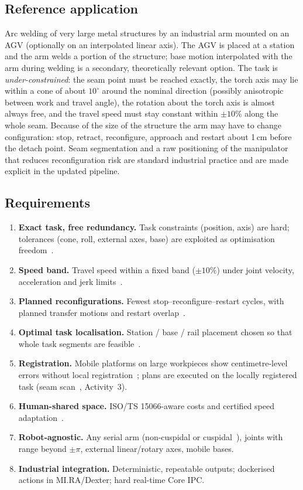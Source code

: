 \subsection{Reference application}
Arc welding of very large metal structures by an industrial arm mounted on an AGV (optionally on an interpolated linear axis). The AGV is placed at a station and the arm welds a portion of the structure; base motion interpolated with the arm during welding is a secondary, theoretically relevant option. The task is \emph{under-constrained}: the seam point must be reached exactly, the torch axis may lie within a cone of about $10^\circ$ around the nominal direction (possibly anisotropic between work and travel angle), the rotation about the torch axis is almost always free, and the travel speed must stay constant within $\pm10\%$ along the whole seam. Because of the size of the structure the arm may have to change configuration: stop, retract, reconfigure, approach and restart about 1\,cm before the detach point. Seam segmentation and a raw positioning of the manipulator that reduces reconfiguration risk are standard industrial practice and are made explicit in the updated pipeline.

\subsection{Requirements}\label{sec:req}
\begin{enumerate}[label=R\arabic*.]
\item \textbf{Exact task, free redundancy.} Task constraints (position, axis) are hard; tolerances (cone, roll, external axes, base) are exploited as optimisation freedom~\cite{demaeyer2017descartes,chen2025cooptimization}.
\item \textbf{Speed band.} Travel speed within a fixed band ($\pm10\%$) under joint velocity, acceleration and jerk limits~\cite{lange2016pathaccurate}.
\item \textbf{Planned reconfigurations.} Fewest stop--reconfigure--restart cycles, with planned transfer motions and restart overlap~\cite{yin2024dpbreakpoints,wang2025anytimetracking}.
\item \textbf{Optimal task localisation.} Station / base / rail placement chosen so that whole task segments are feasible~\cite{weingartshofer2021tcpbase,wachter2024tcpbase}.
\item \textbf{Registration.} Mobile platforms on large workpieces show centimetre-level errors without local registration~\cite{zhao2021mobilemachining}; plans are executed on the locally registered task (seam scan~\cite{wang2026torchposture}, Activity~3).
\item \textbf{Human-shared space.} ISO/TS 15066-aware costs and certified speed adaptation~\cite{faroni2022safetyaware,gursoy2026cosmik}.
\item \textbf{Robot-agnostic.} Any serial arm (non-cuspidal or cuspidal~\cite{elias2025cuspidal}), joints with range beyond $\pm\pi$, external linear/rotary axes, mobile bases.
\item \textbf{Industrial integration.} Deterministic, repeatable outputs; dockerised actions in MI.RA/Dexter; hard real-time Core IPC.
\end{enumerate}
